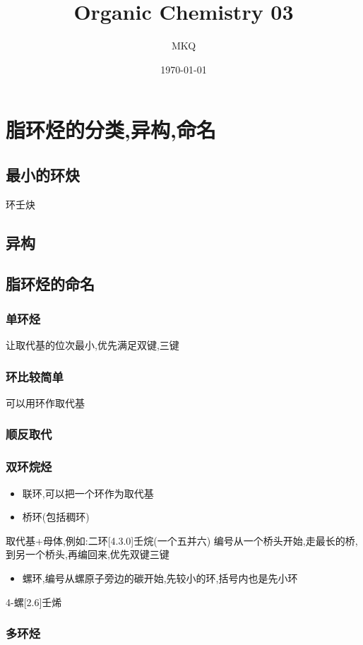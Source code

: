 \documentclass[11pt]{article}
\author{MKQ}
\date{\today}
\title{Organic Chemistry 03}
\begin{document}
\maketitle
\tableofcontents

\section{脂环烃的分类,异构,命名}
\label{sec:org5dd73b1}
\subsection{最小的环炔}
\label{sec:org8bc02f1}
环壬炔
\subsection{异构}
\label{sec:orga73c198}
\subsection{脂环烃的命名}
\label{sec:org47c017c}
\subsubsection{单环烃}
\label{sec:org72b3bdb}
让取代基的位次最小,优先满足双键,三键
\subsubsection{环比较简单}
\label{sec:orgf39c457}
可以用环作取代基
\subsubsection{顺反取代}
\label{sec:org850f3a4}
\subsubsection{双环烷烃}
\label{sec:orgf01eb91}
\begin{itemize}
\item 联环,可以把一个环作为取代基
\item 桥环(包括稠环)
\end{itemize}
取代基+母体,例如:二环[4.3.0]壬烷(一个五并六)
编号从一个桥头开始,走最长的桥,到另一个桥头,再编回来,优先双键三键
\begin{itemize}
\item 螺环,编号从螺原子旁边的碳开始,先较小的环,括号内也是先小环
\end{itemize}
4-螺[2.6]壬烯
\subsubsection{多环烃}
\label{sec:orgb50eeca}
\end{document}
